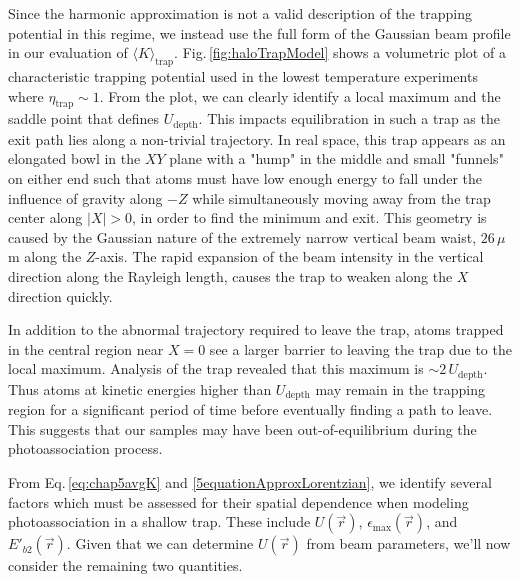 Since the harmonic approximation is not a valid description of the trapping potential in this regime, we instead use the full form of the Gaussian beam profile in our evaluation of $\langle K \rangle_\text{trap}$.
Fig.\,\ref{fig:haloTrapModel} shows a volumetric plot of a characteristic trapping potential used in the lowest temperature experiments where $\eta_\text{trap} \sim 1$.
From the plot, we can clearly identify a local maximum and the saddle point that defines $U_\text{depth}$.
This impacts equilibration in such a trap as the exit path lies along a non-trivial trajectory.
In real space, this trap appears as an elongated bowl in the $XY$ plane with a "hump" in the middle and small "funnels" on either end such that atoms must have low enough energy to fall under the influence of gravity along $-Z$ while simultaneously moving away from the trap center along $|X| > 0$, in order to find the minimum and exit.
This geometry is caused by the Gaussian nature of the extremely narrow vertical beam waist, $26\,\mu$m along the $Z$-axis.
The rapid expansion of the beam intensity in the vertical direction along the Rayleigh length, causes the trap to weaken along the $X$ direction quickly.

In addition to the abnormal trajectory required to leave the trap, atoms trapped in the central region near $X=0$ see a larger barrier to leaving the trap due to the local maximum.
Analysis of the trap revealed that this maximum is $\sim 2 \, U_\text{depth}$.
Thus atoms at kinetic energies higher than $U_\text{depth}$ may remain in the trapping region for a significant period of time before eventually finding a path to leave.
This suggests that our samples may have been out-of-equilibrium during the photoassociation process.

From Eq.\,\ref{eq:chap5avgK} and \ref{5equationApproxLorentzian}, we identify several factors which must be assessed for their spatial dependence when modeling photoassociation in a shallow trap.
These include $U(\vec{r})$, $\epsilon_\text{max}(\vec{r})$, and $E'_{b2}(\vec{r})$.
Given that we can determine $U(\vec{r})$ from beam parameters, we'll now consider the remaining two quantities.


